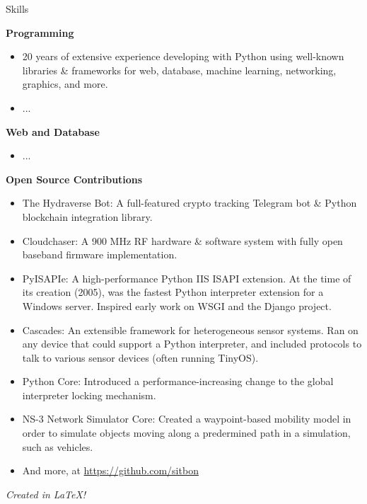 \documentclass[12pt]{article}
\newcommand{\skillitem}[1]{
	{\bfseries \footnotesize{#1}}\\
}
\begin{document}
\begin{resumeblock}{Skills}
\skillitem{Programming}\vspace{-0.18in}
\begin{itemize}[nosep,leftmargin=1.2em,label=\tiny{\protect$\bullet$}]
\item{20 years of extensive experience developing with Python using well-known libraries \& frameworks for web, database, machine learning, networking, graphics, and more.}
\item{...}
\end{itemize}\vspace{1em}

\skillitem{Web and Database}\vspace{-0.18in}
\begin{itemize}[nosep,leftmargin=1.2em,label=\tiny{\protect$\bullet$}]
\item{...}
\end{itemize}\vspace{1em}

\skillitem{Open Source Contributions}\vspace{-0.18in}
\begin{itemize}[nosep,leftmargin=1.2em,label=\tiny{\protect$\bullet$}]
\item{The Hydraverse Bot: A full-featured crypto tracking Telegram bot \& Python blockchain integration library.}
\item{Cloudchaser: A 900 MHz RF hardware \& software system with fully open baseband firmware implementation.}
\item{PyISAPIe: A high-performance Python IIS ISAPI extension. At the time of its creation (2005), was the fastest Python interpreter extension for a Windows server. Inspired early work on WSGI and the Django project.}
\item{Cascades: An extensible framework for heterogeneous sensor systems.
Ran on any device that could support a Python interpreter, and included protocols to talk to various sensor devices (often running TinyOS).}
\item{Python Core: Introduced a performance-increasing change to the global interpreter locking mechanism.}
\item{NS-3 Network Simulator Core: Created a waypoint-based mobility model in order to simulate objects moving along a predermined path in a simulation, such as vehicles.}
\item And more, at \url{https://github.com/sitbon}
\end{itemize}\vspace{1em}

\end{resumeblock}

\vspace*{\fill}
\par
\tiny\textit{Created in LaTeX!}
\end{document}

